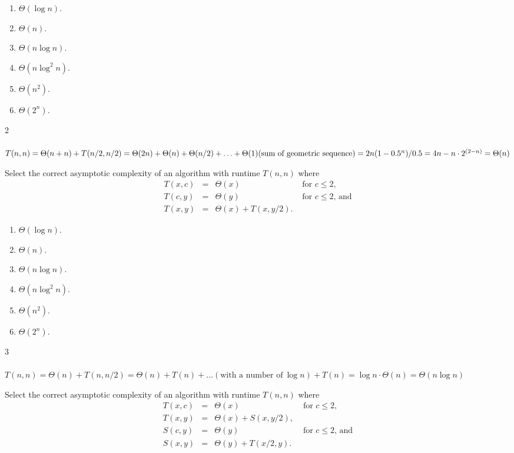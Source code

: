 \documentclass[12pt,twoside]{article}
\begin{document}
\begin{problems}
\begin{problemparts}
\begin{enumerate}
\item $\Theta(\log n)$.
\item $\Theta(n)$.
\item $\Theta(n \log n)$.
\item $\Theta(n \log^2 n)$.
\item $\Theta(n^2)$.
\item $\Theta(2^n)$.
\end{enumerate}

\ifsolution \solution{}
2
\\
\\
$T(n,n)=\Theta(n+n)+T(n/2,n/2)=\Theta(2n)+\Theta(n)+\Theta(n/2)+\ldots
+\Theta(1)\\
(\text{sum of geometric sequence})=2n(1-0.5^n)/0.5=4n-n\cdot 2^{(2-n)}=\Theta(n)$
\\
\fi

\problempart {}
Select the correct asymptotic complexity
of an algorithm with runtime $T(n, n)$
where 
$$
\begin{array}{rcll}
T(x, c) &=& \Theta(x) & \textrm{ for $c \le 2$}, \\
T(c, y) &=& \Theta(y) & \textrm{ for $c \le 2$, and} \\
T(x, y) &=& \Theta(x) + T(x, y / 2).
\end{array}
$$

\begin{enumerate}
\item $\Theta(\log n)$.
\item $\Theta(n)$.
\item $\Theta(n \log n)$.
\item $\Theta(n \log^2 n)$.
\item $\Theta(n^2)$.
\item $\Theta(2^n)$.
\end{enumerate}

\ifsolution \solution{}
3
\\
\\
$T(n,n)=\Theta(n)+T(n,n/2)=\Theta(n)+T(n)+\ldots(\text{with a number of}~ \log n )+T(n)=\log n \cdot\Theta(n)=\Theta(n\log n)$
\\
\fi

\problempart {}
Select the correct asymptotic complexity
of an algorithm with runtime $T(n, n)$
where 
$$
\begin{array}{rcll}
T(x, c) &=& \Theta(x) & \textrm{ for $c \le 2$}, \\
T(x, y) &=& \Theta(x) + S(x, y / 2), \\
S(c, y) &=& \Theta(y) & \textrm{ for $c \le 2$, and} \\
S(x, y) &=& \Theta(y) + T(x / 2, y).
\end{array}
$$


\end{problemparts}
\end{problems}
\end{document}
